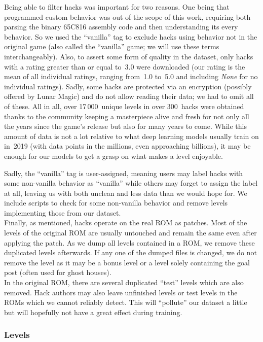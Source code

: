 Being able to filter hacks was important for two reasons. One being
that programmed custom behavior was out of the scope of this work,
requiring both parsing the binary 65C816 assembly code and then
understanding its every behavior. So we used the ``vanilla'' tag to
exclude hacks using behavior not in the original game (also called
the ``vanilla'' game; we will use these terms interchangeably). 
Also, to assert some form of quality in the dataset, only hacks with a
rating greater than or equal to~3.0 were downloaded (our rating is the
mean of all individual ratings, ranging from~1.0 to~5.0 and including
\emph{None} for no individual ratings). Sadly, some hacks are
protected via an encryption (possibly offered by Lunar Magic) and do
not allow reading their data; we had to omit all of these. All in all,
over 17\,000~unique levels in over 300~hacks were obtained thanks to
the community keeping a masterpiece alive and fresh for not only all
the years since the game's release but also for many years to come.
While this amount of data is not a lot relative to what deep learning
models usually train on in~2019 (with data points in the millions,
even approaching billions), it may be enough for our models to get a
grasp on what makes a level enjoyable.

Sadly, the ``vanilla'' tag is user-assigned, meaning users may label
hacks with some non-vanilla behavior as ``vanilla'' while others may
forget to assign the label at all, leaving us with both unclean and
less data than we would hope for. We include scripts to check for some
non-vanilla behavior and remove levels implementing those from our
dataset. \\
Finally, as mentioned, hacks operate on the real ROM as patches. Most
of the levels of the original ROM are usually untouched and remain the
same even after applying the patch. As we dump all levels contained in
a ROM, we remove these duplicated levels afterwards. If any one of the
dumped files is changed, we do not remove the level as it may be a
bonus level or a level solely containing the goal post (often used for
ghost houses). \\
In the original ROM, there are several duplicated ``test'' levels
which are also removed. Hack authors may also leave unfinished levels
or test levels in the ROMs which we cannot reliably detect. This will
``pollute'' our dataset a little but will hopefully not have a great
effect during training.

\subsubsection{Levels}
\label{sec:levels}

